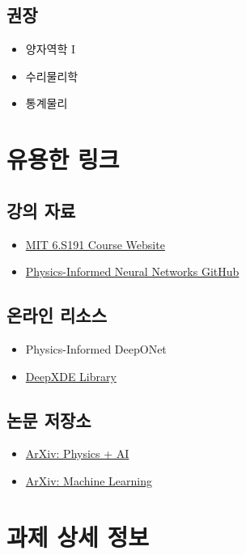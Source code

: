 \documentclass[11pt,a4paper]{article}
\begin{document}
\subsection*{권장}
\begin{itemize}[noitemsep]
    \item 양자역학 I
    \item 수리물리학
    \item 통계물리
\end{itemize}

\section{유용한 링크}

\subsection{강의 자료}
\begin{itemize}[noitemsep]
    \item \href{http://introtodeeplearning.com/}{MIT 6.S191 Course Website}
    \item \href{https://github.com/maziarraissi/PINNs}{Physics-Informed Neural Networks GitHub}
\end{itemize}

\subsection{온라인 리소스}
\begin{itemize}[noitemsep]
    \item Physics-Informed DeepONet
    \item \href{https://deepxde.readthedocs.io/}{DeepXDE Library}
\end{itemize}

\subsection{논문 저장소}
\begin{itemize}[noitemsep]
    \item \href{https://arxiv.org/list/physics.comp-ph/recent}{ArXiv: Physics + AI}
    \item \href{https://arxiv.org/list/cs.LG/recent}{ArXiv: Machine Learning}
\end{itemize}

\section{과제 상세 정보}
\end{document}
